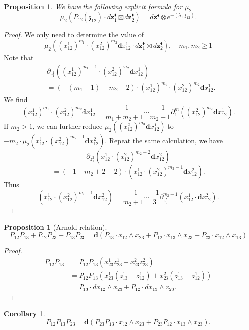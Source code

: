 \documentclass[11pt]{amsart}
\newtheorem{cor}[thm]{Corollary}
\newtheorem{prop}[thm]{Proposition}
\theoremstyle{definition}
\theoremstyle{remark}
\numberwithin{equation}{section}
\begin{document}
\begin{prop}
We have the following explicit formula for $\mu_2$
$$
\mu_2\left(P_{12}(\mathfrak{z}_{12})\cdot
  d \mathbf{z}_{1}^{\blacklozenge} \boxtimes d \mathbf{z}^{\blacklozenge}_{2}
  \right)
=d\mathbf{z}^{\blacklozenge}\otimes e^{-(\lambda_1|\mathfrak{z}_{12})}.
$$
\end{prop}
\begin{proof}
We only need to determine the value of
$$
\mu_2\left((x^1_{12})^{m_1}\cdot (x^2_{12})^{m_2}\mathbf{d}x^1_{12}\cdot
  d \mathbf{z}_{1}^{\blacklozenge} \boxtimes d \mathbf{z}^{\blacklozenge}_{2}
\right),\quad m_1,m_2\geq 1
$$
Note that
\begin{align*}
&\partial_{z^1_1}\left((x^1_{12})^{m_1-1}\cdot (x^2_{12})^{m_2}\mathbf{d}x^1_{12}\right)\\
&=\left(-(m_1-1)-m_2-2\right)\cdot (x^1_{12})^{m_1}\cdot (x^2_{12})^{m_2}\mathbf{d}x^1_{12}.
\end{align*}
We find
$$
(x^1_{12})^{m_1}\cdot (x^2_{12})^{m_2}\mathbf{d}x^1_{12}=\frac{-1}{m_1+m_2+1}\cdots\frac{-1}{m_2+1}\partial^m_1\left((x^2_{12})^{m_2}\mathbf{d}x^1_{12}\right).
$$
If $m_2>1$, we can further reduce $\mu_2\left((x^2_{12})^{m_2}\mathbf{d}x^1_{12}\right)$ to $-m_2\cdot\mu_2\left(x^1_{12}\cdot(x^2_{12})^{m_2-1}\mathbf{d}x^2_{12}\right)$. Repeat the same calculation, we have
$$
\partial_{z^2_{1}}\left(x^1_{12}\cdot (x^2_{12})^{m_2-2}\mathbf{d}x^2_{12}\right)
$$
$$
=(-1-m_2+2-2)\cdot \left(x^1_{12}\cdot (x^2_{12})^{m_2-1}\mathbf{d}x^2_{12}\right).
$$
Thus
$$
\left(x^1_{12}\cdot (x^2_{12})^{m_2-1}\mathbf{d}x^2_{12}\right)=\frac{-1}{m_2+1}\cdots \frac{-1}{3}\partial^{m_2-1}_{z^2_1} \left(x^1_{12}\cdot \mathbf{d}x^2_{12}\right).
$$
\end{proof}

\begin{prop}[Arnold relation]
  $$
  P_{12}P_{13}+P_{12}P_{23}+P_{13}P_{23}=\mathbf{d}\left(P_{13}\cdot x_{12}\wedge x_{23}+P_{12}\cdot x_{13}\wedge x_{23}+P_{23}\cdot x_{12}\wedge x_{13}\right)
  $$
\end{prop}
\begin{proof}
  \begin{align*}
   P_{12}P_{13}  &=P_{12}P_{13}(x^1_{23}z^1_{23}+x^2_{23}z^2_{23})  \\
     & =P_{12}P_{13}\left(x^1_{23}(z^1_{13}-z^1_{12})+x^2_{23}(z^1_{13}-z^1_{12})\right)\\
     &=P_{13}\cdot dx_{12}\wedge x_{23}+P_{12}\cdot dx_{13}\wedge x_{23}.
  \end{align*}
\end{proof}
\begin{cor}\label{RecursiveLemma}
  $$
  P_{12}P_{13}P_{23}=\mathbf{d}\left(P_{23}P_{13}\cdot x_{12}\wedge x_{23}+P_{23}P_{12}\cdot x_{13}\wedge x_{23}\right).
  $$
\end{cor}
\end{document}
